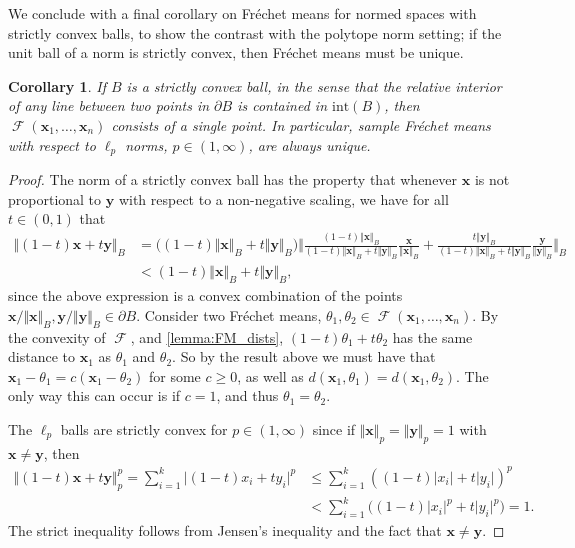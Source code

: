 \documentclass[10pt]{article}
\newtheorem{corollary}[theorem]{Corollary}
\theoremstyle{definition}
\theoremstyle{remark}
\DeclareMathOperator{\FMset}{\mathcal{F}}
\renewcommand{\vec}[1]{\mathbf{#1}}
\begin{document}
	We conclude with a final corollary on Fr\'echet means for normed spaces with strictly convex balls, to show the contrast with the polytope norm setting; if the unit ball of a norm is strictly convex, then Fr\'echet means must be unique.
	
	\begin{corollary}
		If $B$ is a strictly convex ball, in the sense that the relative interior of any line between two points in $\partial B$ is contained in $\mathrm{int}(B)$, then $\FMset (\vec x_1,\ldots,\vec x_n)$ consists of a single point. In particular, sample Fr\'echet means with respect to $\ell_p$ norms, $p \in (1,\infty)$, are always unique.
	\end{corollary}
	\begin{proof}
		The norm of a strictly convex ball has the property that whenever $\vec x$ is not proportional to $\vec y$ with respect to a non-negative scaling, we have for all $t \in (0,1)$ that 
		\begin{align*}
			\Vert (1-t)\vec x + t \vec y\Vert_B &= \big((1-t)\Vert \vec x \Vert_B + t\Vert \vec y \Vert_B\big)     \bigg\Vert \frac{(1-t)\Vert \vec x \Vert_B}{(1-t)\Vert \vec x \Vert_B + t\Vert \vec y \Vert_B} \frac{\vec x}{\Vert \vec x \Vert_B} + \frac{t\Vert \vec y \Vert_B}{(1-t)\Vert \vec x \Vert_B + t\Vert \vec y \Vert_B} \frac{\vec y}{\Vert \vec y \Vert_B} \bigg\Vert_B 
			\\
			&< (1-t)\Vert \vec x\Vert_B + t \Vert \vec y\Vert_B,
		\end{align*}
		since the above expression is a convex combination of the points $\vec x/\Vert \vec x \Vert_B, \vec y/\Vert \vec y \Vert_B \in \partial B$. Consider two Fr\'echet means, $\theta_1,\theta_2 \in \FMset(\vec x_1, \dots, \vec x_n)$. By the convexity of $\FMset$, and \cref{lemma:FM_dists}, $(1-t)\theta_1 + t\theta_2$ has the same distance to $\vec x_1$ as $\theta_1$ and $\theta_2$. So by the result above we must have that $\vec x_1 - \theta_1 = c(\vec x_1 - \theta_2)$ for some $c \geq 0$, as well as $d(\vec x_1, \theta_1) = d(\vec x_1, \theta_2)$. The only way this can occur is if $c = 1$, and thus $\theta_1 = \theta_2$. 
		
		The $\ell_p$ balls are strictly convex for $p \in (1,\infty)$ since if $\Vert \vec x \Vert_p = \Vert \vec y \Vert_p = 1$ with $\vec x \neq \vec y$, then  
		\begin{align*}
			\Vert (1-t)\vec x + t \vec y \Vert_p^p =   \textstyle\sum_{i = 1}^k \vert (1-t)x_i + ty_i\vert^p & \leq     \textstyle\sum_{i = 1}^k  ((1-t)\vert x_i \vert + t\vert y_i \vert)^p
			\\
			& <   \textstyle\sum_{i = 1}^k  \big((1-t)\vert x_i \vert^p  + t\vert y_i \vert^p\big) = 1.
		\end{align*}
		The strict inequality follows from Jensen's inequality and the fact that $\vec x \neq \vec y$.
	\end{proof}
	
\end{document}
